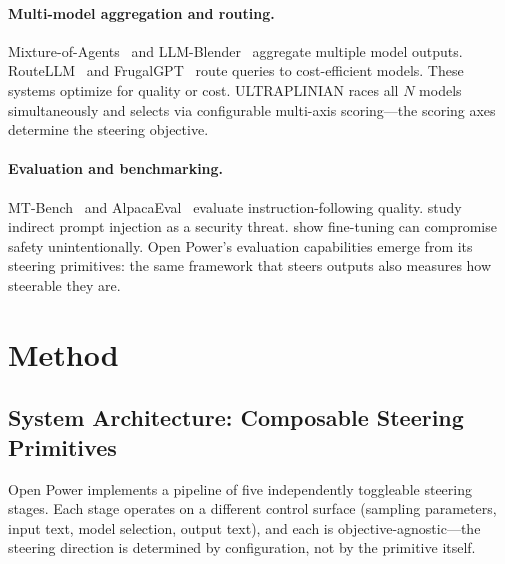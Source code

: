 \documentclass[11pt]{article}
\begin{document}
\paragraph{Multi-model aggregation and routing.}
Mixture-of-Agents~\cite{wang2024mixture} and LLM-Blender~\cite{jiang2023llmblender} aggregate multiple model outputs. RouteLLM~\cite{ong2024routellm} and FrugalGPT~\cite{chen2023frugalgpt} route queries to cost-efficient models. These systems optimize for quality or cost. ULTRAPLINIAN races all $N$ models simultaneously and selects via configurable multi-axis scoring---the scoring axes determine the steering objective.

\paragraph{Evaluation and benchmarking.}
MT-Bench~\cite{zheng2024judging} and AlpacaEval~\cite{li2023alpacaeval} evaluate instruction-following quality. \citet{greshake2023not} study indirect prompt injection as a security threat. \citet{qi2024finetuning} show fine-tuning can compromise safety unintentionally. Open Power's evaluation capabilities emerge from its steering primitives: the same framework that steers outputs also measures how steerable they are.

\section{Method}
\label{sec:method}

\subsection{System Architecture: Composable Steering Primitives}

Open Power implements a pipeline of five independently toggleable steering stages. Each stage operates on a different control surface (sampling parameters, input text, model selection, output text), and each is objective-agnostic---the steering direction is determined by configuration, not by the primitive itself.
\end{document}
